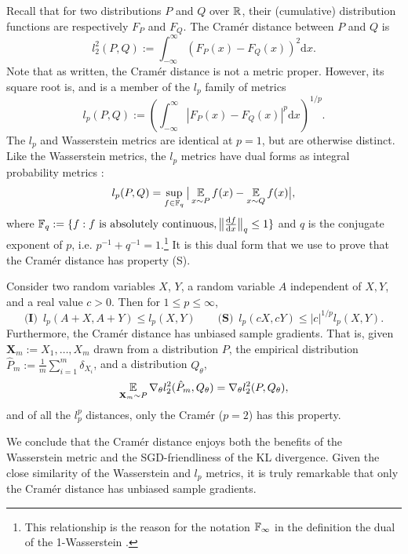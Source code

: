 \documentclass{article}
\def \ldive {l}
\def \dx {\textrm{d} x}
\def \Qtheta {Q_\theta}
\def \gradtheta {{\grad_\theta}}
\def \batch {\mathbf{X}_m}
\begin{document}
Recall that for two distributions $P$ and $Q$ over $\mathbb{R}$, their (cumulative) distribution functions are respectively $F_P$ and $F_Q$. The Cram{\'e}r distance between $P$ and $Q$ is %
\begin{equation*}
\ldive^2_2(P, Q) := \int_{-\infty}^\infty (F_P(x) - F_Q(x))^2 \dx .
\end{equation*}
Note that as written, the Cram\'er distance is not a metric proper. However, its square root is, and is a member of the $\ldive_p$ family of metrics
\begin{equation*}
  \ldive_p(P, Q) := \left ( \int_{-\infty}^\infty |F_P(x) - F_Q(x)|^p \dx \right )^{1/p} .
\end{equation*}
The $\ldive_p$ and Wasserstein metrics are identical at $p=1$, but are otherwise distinct. Like the Wasserstein metrics, the $\ldive_p$ metrics have dual forms as integral probability metrics \citep[see][for a proof]{dedecker07empirical}:
\begin{equation}
\ldive_p(P, Q) = \sup_{f \in \bF_q} \big | \expect_{x \sim P} f(x) - \expect_{x \sim Q} f(x) \big |, \label{eqn:cramer_ipm}
\end{equation}
where $\mathbb{F}_q := \{ f : f \text{ is absolutely continuous}, \big \| \frac{\text{d} f}{\text{d}x} \big \|_q \le 1 \}$ and $q$ is the conjugate exponent of $p$, i.e. $p^{-1} + q^{-1} = 1$.\footnote{This relationship is the reason for the notation $\mathbb{F}_\infty$ in the definition the dual of the 1-Wasserstein .}
It is this dual form that we use to prove that the Cram\'er distance has property (S).
\begin{thm}\label{thm:cramer_properties}
Consider two random variables $X$, $Y$, a random variable $A$ independent of $X, Y$, and a real value $c > 0$. Then for $1 \le p \le \infty$,
\begin{equation*}
\textbf{(I) } \, \ldive_p(A + X, A + Y) \le \ldive_p(X, Y) \qquad \textbf{(S) } \, \ldive_p(cX, cY) \le |c|^{1/p} \ldive_p(X, Y) .
\end{equation*}
Furthermore, the Cram\'er distance has unbiased sample gradients. That is, given $\batch := X_1, \dots, X_m$ drawn from a distribution $P$, the empirical distribution $\hat P_m := \tfrac{1}{m} \sum_{i=1}^m \delta_{X_i}$, and a distribution $\Qtheta$,
\begin{equation*}
\expect_{\batch \sim P} \gradtheta l^2_2 (\hat P_m, \Qtheta) = \gradtheta l^2_2(P, \Qtheta),
\end{equation*}
and of all the $l_p^p$ distances, only the Cram\'er ($p = 2$) has this property.
\end{thm}
We conclude that the Cram\'er distance enjoys both the benefits of the Wasserstein metric and the SGD-friendliness of the KL divergence. Given the close similarity of the Wasserstein and $l_p$ metrics, it is truly remarkable that only the Cram\'er distance has unbiased sample gradients.
\end{document}
